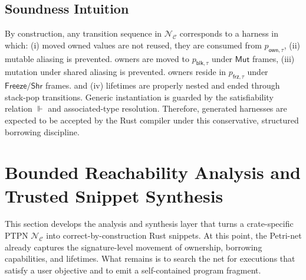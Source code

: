 \documentclass[sigconf]{acmart}
\begin{document}
\subsection{Soundness Intuition}
\label{sec:method:soundness}
By construction, any transition sequence in $\mathcal{N}_{\mathcal{C}}$ corresponds to a harness in which:
(i) moved owned values are not reused, they are consumed from $p_{\mathsf{own},\tau}$,
(ii) mutable aliasing is prevented. owners are moved to $p_{\mathsf{blk},\tau}$ under $\mathsf{Mut}$ frames,
(iii) mutation under shared aliasing is prevented. owners reside in $p_{\mathsf{frz},\tau}$ under $\mathsf{Freeze}/\mathsf{Shr}$ frames. and
(iv) lifetimes are properly nested and ended through stack-pop transitions.
Generic instantiation is guarded by the satisfiability relation $\Vdash$ and associated-type resolution.
Therefore, generated harnesses are expected to be accepted by the Rust compiler under this conservative, structured borrowing discipline.

\section{Bounded Reachability Analysis and Trusted Snippet Synthesis}
\label{sec:analysis}
This section develops the analysis and synthesis layer that turns a crate-specific PTPN $\mathcal{N}_{\mathcal{C}}$ into correct-by-construction Rust snippets. At this point, the Petri-net already captures the signature-level movement of ownership, borrowing capabilities, and lifetimes. What remains is to search the net for executions that satisfy a user objective and to emit a self-contained program fragment.
\end{document}
